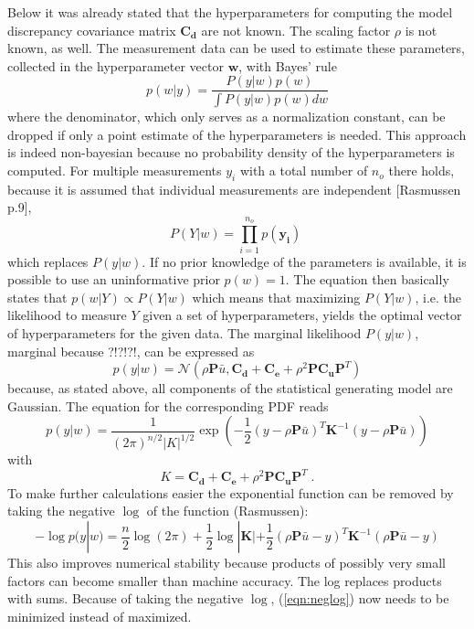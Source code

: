 \documentclass[%
  a4paper,oneside,%
  11pt,%
  smallchapters,
  green,%
  rgb, <cmyk>
  ]{tubsbook}
\begin{document}
Below it was already stated that the hyperparameters for computing the model discrepancy covariance matrix $\bm{C_d}$ are not known. The scaling factor $\rho$ is not known, as well. The measurement data can be used to estimate these parameters, collected in the hyperparameter vector $\bm{w}$, with Bayes' rule 
%
\begin{equation}
p(w|y) = \frac{P(y|w) p(w)}{\int P(y|w) p(w) dw}
\end{equation}
%
where the denominator, which only serves as a normalization constant, can be dropped if only a point estimate of the hyperparameters is needed. This approach is indeed non-bayesian because no probability density of the hyperparameters is computed. For multiple measurements $y_i$ with a total number of $n_o$ there holds, because it is assumed that individual measurements are independent [Rasmussen p.9],
\begin{equation}
P(Y|w) = \prod_{i=1}^{n_o} p(\bm{y_i}) \; 
\end{equation}
which replaces $P(y|w)$.
If no prior knowledge of the parameters is available, it is possible to use an uninformative prior $p(w) = 1$.
The equation then basically states that $p(w|Y) \propto P(Y|w)$ which means that maximizing  $P(Y|w)$, i.e. the likelihood to measure $Y$ given a set of hyperparameters, yields the optimal vector of hyperparameters for the given data. 
The marginal likelihood $P(y|w)$, marginal because ?!?!?!, can be expressed as 
\begin{equation}
p(y|w) = \mathcal{N}(\rho \bm{P}\bar{u}, \bm{C_d}+\bm{C_e} + \rho^2 \bm{P} \bm{C_u} \bm{P}^T)
\end{equation}
because, as stated above, all components of the statistical generating model are Gaussian.
The equation for the corresponding PDF reads
\begin{equation}
p(y|w) = \frac{1}{(2 \pi)^{n/2} |K|^{1/2} } \exp \left(   -\frac{1}{2} (y - \rho \bm{P}\bar{u})^T \bm{K}^{-1} (y - \rho \bm{P}\bar{u})   \right)
\end{equation}
with
\begin{equation}
K = \bm{C_d}+\bm{C_e} + \rho^2 \bm{P} \bm{C_u} \bm{P}^T \; .
\end{equation}
%
To make further calculations easier the exponential function can be removed by taking the negative $\log$ of the function (Rasmussen):
\begin{equation}
- \log p(y|w) = \frac{n}{2} \log(2 \pi) + \frac{1}{2} \log |\bm{K}| + \frac{1}{2}(\rho \bm{P}\bar{u} - y)^T \bm{K}^{-1} (\rho \bm{P}\bar{u} - y) 
\label{eqn:neglog}
\end{equation}
This also improves numerical stability because products of possibly very small factors can become smaller than machine accuracy. The log replaces products with sums.
Because of taking the negative $\log$, (\ref{eqn:neglog}) now needs to be minimized instead of maximized. 
\end{document}
